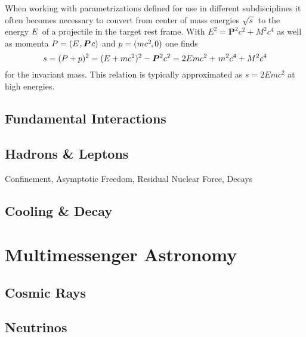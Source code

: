 When working with parametrizations defined for use in different subdisciplines it often becomes necessary to convert from
center of mass energies $\sqrt{s \kern+1.0pt} \kern+1.0pt$ to the energy $\kern-0.5pt E \kern+1.0pt$ of a projectile in the
target rest frame. With $E^2 = \bm{P}^2 c^2 + M^2 c^4$ as well as momenta $P = (E \kern+1.0pt , \bm{P} \kern+0.75pt c)$ and
$p = (m c^2 \kern-1.0pt , 0)$ one finds
\begin{equation*}
	s = (P + p)^2 = (E + m c^2)^2 - \bm{P}^2 c^2 = 2E m c^2 + \kern+1.0pt m^2 c^4 + M^2 c^4
\end{equation*}
for the invariant mass. This relation is typically approximated as $s = 2E m c^2$ at high energies.



\subsection{Fundamental Interactions}
\label{sub:interactions}



\subsection{Hadrons \& Leptons}
\label{sub:hadrons}

Confinement, Asymptotic Freedom, Residual Nuclear Force, Decays



\subsection{Cooling \& Decay}
\label{sub:cooling}



\section{Multimessenger Astronomy}
\label{sec:multimessenger}



\subsection{Cosmic Rays}
\label{sub:rays}



\subsection{Neutrinos}
\label{sub:neutrinos}



